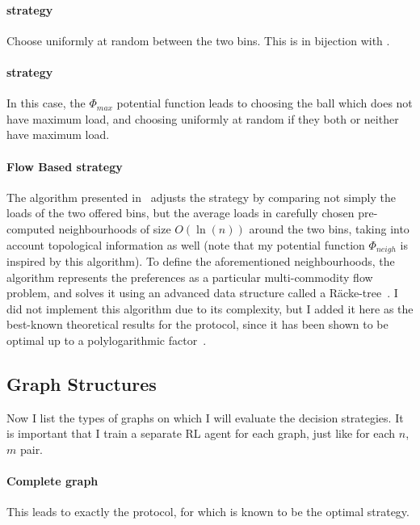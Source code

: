 \paragraph{\Random strategy} Choose uniformly at random between the two bins. This is in bijection with \OneChoice.


\paragraph{\LocalRewardOptimiser strategy} In this case, the $\Phi_{max}$ potential function leads to choosing the ball which does not have maximum load, and choosing uniformly at random if they both or neither have maximum load.


\paragraph{Flow Based strategy}

The algorithm presented in~\cite{bansal2021twochoicegraphical} adjusts the \Greedy strategy by comparing not simply the loads of the two offered bins, but the average loads in carefully chosen pre-computed neighbourhoods of size $O(\ln(n))$ around the two bins, taking into account topological information as well (note that my potential function $\Phi_{neigh}$ is inspired by this algorithm). To define the aforementioned neighbourhoods, the algorithm represents the preferences as a particular multi-commodity flow problem, and solves it using an advanced data structure called a R\"{a}cke-tree~\cite{racke2008racketree}. I did not implement this algorithm due to its complexity, but I added it here as the best-known theoretical results for the \GraphicalTwoChoice protocol, since it has been shown to be optimal up to a polylogarithmic factor~\cite{bansal2021twochoicegraphical}.



\subsection{Graph Structures}


Now I list the types of graphs on which I will evaluate the decision strategies. It is important that I train a separate RL agent for each graph, just like for each $n$, $m$ pair.


\paragraph{Complete graph} This leads to exactly the \TwoChoice protocol, for which \Greedy is known to be the optimal strategy. 


